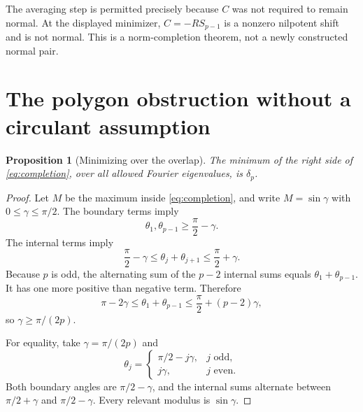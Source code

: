 \documentclass[11pt]{article}
\newtheorem{proposition}[theorem]{Proposition}
\theoremstyle{remark}
\begin{document}
The averaging step is permitted precisely because $C$ was not required to remain normal. At the displayed minimizer, $C=-RS_{p-1}$ is a nonzero nilpotent shift and is not normal. This is a norm-completion theorem, not a newly constructed normal pair.

\section{The polygon obstruction without a circulant assumption}
\begin{proposition}[Minimizing over the overlap]\label{prop:angles}
The minimum of the right side of \eqref{eq:completion}, over all allowed Fourier eigenvalues, is $\delta_p$.
\end{proposition}
\begin{proof}
Let $M$ be the maximum inside \eqref{eq:completion}, and write $M=\sin\gamma$ with $0\le\gamma\le\pi/2$. The boundary terms imply
\[
 \theta_1,\theta_{p-1}\ge\frac\pi2-\gamma.
\]
The internal terms imply
\[
 \frac\pi2-\gamma\le\theta_j+\theta_{j+1}\le\frac\pi2+\gamma.
\]
Because $p$ is odd, the alternating sum of the $p-2$ internal sums equals $\theta_1+\theta_{p-1}$. It has one more positive than negative term. Therefore
\[
 \pi-2\gamma\le\theta_1+\theta_{p-1}
 \le\frac\pi2+(p-2)\gamma,
\]
so $\gamma\ge\pi/(2p)$.

For equality, take $\gamma=\pi/(2p)$ and
\begin{equation}\label{eq:optimal-angles}
 \theta_j=\begin{cases}\pi/2-j\gamma,&j\text{ odd},\\j\gamma,&j\text{ even}.
 \end{cases}
\end{equation}
Both boundary angles are $\pi/2-\gamma$, and the internal sums alternate between $\pi/2+\gamma$ and $\pi/2-\gamma$. Every relevant modulus is $\sin\gamma$.
\end{proof}
\end{document}
